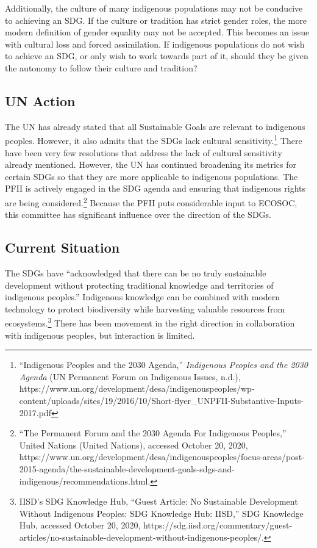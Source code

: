 \documentclass[10pt, letterpaper]{article}
\begin{document}
Additionally, the culture of many indigenous populations may not be
conducive to achieving an SDG. If the culture or tradition has strict
gender roles, the more modern definition of gender equality may not be
accepted. This becomes an issue with cultural loss and forced
assimilation. If indigenous populations do not wish to achieve an SDG,
or only wish to work towards part of it, should they be given the
autonomy to follow their culture and tradition?

\subsection{UN Action}

The UN has already stated that all Sustainable Goals are relevant to
indigenous peoples. However, it also admits that the SDGs lack cultural
sensitivity.\footnote{``Indigenous Peoples and the 2030 Agenda,''
  \emph{Indigenous Peoples and the 2030 Agenda} (UN Permanent Forum on
  Indigenous Issues, n.d.),
  https://www.un.org/development/desa/indigenouspeoples/wp-content/uploads/sites/19/2016/10/Short-flyer\_UNPFII-Substantive-Inputs-2017.pdf}
There have been very few resolutions that address the lack of cultural
sensitivity already mentioned. However, the UN has continued broadening
its metrics for certain SDGs so that they are more applicable to
indigenous populations. The PFII is actively engaged in the SDG agenda
and ensuring that indigenous rights are being considered.\footnote{``The
  Permanent Forum and the 2030 Agenda For Indigenous Peoples,'' United
  Nations (United Nations), accessed October 20, 2020,
  https://www.un.org/development/desa/indigenouspeoples/focus-areas/post-2015-agenda/the-sustainable-development-goals-sdgs-and-indigenous/recommendations.html.}
Because the PFII puts considerable input to ECOSOC, this committee has
significant influence over the direction of the SDGs. \\

\subsection{Current Situation}

The SDGs have ``acknowledged that there can be no truly sustainable
development without protecting traditional knowledge and territories of
indigenous peoples.'' Indigenous knowledge can be combined with modern
technology to protect biodiversity while harvesting valuable resources
from ecosystems.\footnote{IISD's SDG Knowledge Hub, ``Guest Article: No
  Sustainable Development Without Indigenous Peoples: SDG Knowledge Hub:
  IISD,'' SDG Knowledge Hub, accessed October 20, 2020,
  https://sdg.iisd.org/commentary/guest-articles/no-sustainable-development-without-indigenous-peoples/.}
There has been movement in the right direction in collaboration with
indigenous peoples, but interaction is limited.\\
\end{document}
